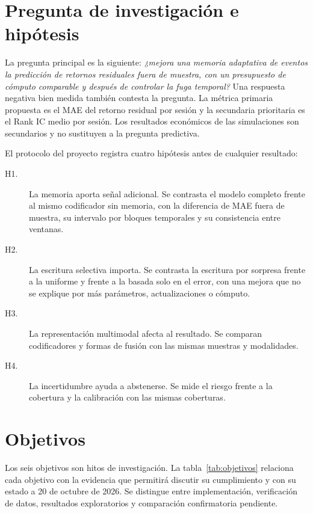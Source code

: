 \documentclass[11pt,a4paper]{report}
\begin{document}
\section{Pregunta de investigación e hipótesis}
La pregunta principal es la siguiente: \emph{¿mejora una memoria adaptativa de
eventos la predicción de retornos residuales fuera de muestra, con un
presupuesto de cómputo comparable y después de controlar la fuga temporal?}
Una respuesta negativa bien medida también contesta la pregunta. La métrica
primaria propuesta es el MAE del retorno residual por sesión y la secundaria
prioritaria es el Rank IC medio por sesión. Los resultados económicos de las
simulaciones son secundarios y no sustituyen a la pregunta predictiva.

El protocolo del proyecto registra cuatro hipótesis antes de cualquier
resultado:
\begin{description}
\item[H1.] La memoria aporta señal adicional. Se contrasta el modelo completo
frente al mismo codificador sin memoria, con la diferencia de MAE fuera de
muestra, su intervalo por bloques temporales y su consistencia entre ventanas.
\item[H2.] La escritura selectiva importa. Se contrasta la escritura por
sorpresa frente a la uniforme y frente a la basada solo en el error, con una
mejora que no se explique por más parámetros, actualizaciones o cómputo.
\item[H3.] La representación multimodal afecta al resultado. Se comparan
codificadores y formas de fusión con las mismas muestras y modalidades.
\item[H4.] La incertidumbre ayuda a abstenerse. Se mide el riesgo frente a la
cobertura y la calibración con las mismas coberturas.
\end{description}

\section{Objetivos}
Los seis objetivos son hitos de investigación. La tabla~\ref{tab:objetivos} relaciona
cada objetivo con la evidencia que permitirá discutir su cumplimiento y con su
estado a 20 de octubre de 2026. Se distingue entre implementación, verificación
de datos, resultados exploratorios y comparación confirmatoria pendiente.
\end{document}
